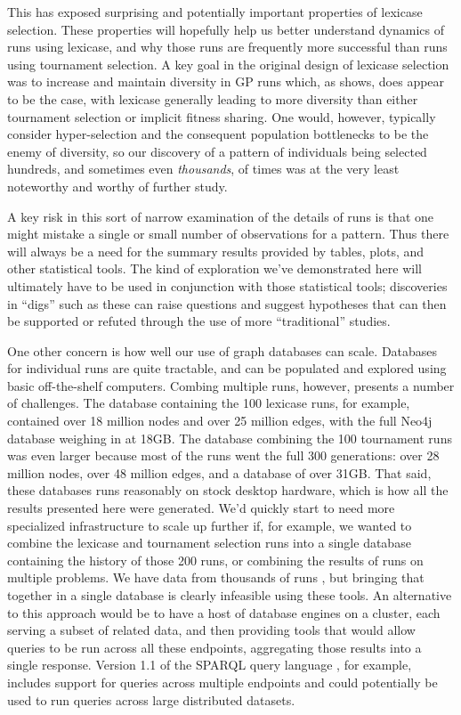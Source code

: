 This has exposed surprising and potentially important properties of lexicase selection. These properties will 
hopefully help us better understand dynamics of runs using lexicase, and why those runs are frequently more 
successful than runs using tournament selection. A key goal in the original design of lexicase selection 
\citep{Helmuth:2015:ieeeTEC} was to increase and maintain diversity in GP runs which, as \citep{Helmuth:2015:GPTP}
shows, does appear to be the case, with lexicase generally leading to more diversity
than either tournament selection or implicit fitness sharing. One would, however, typically consider hyper-selection
and the consequent population bottlenecks to be the enemy of diversity, so our discovery of a pattern of
individuals being selected hundreds, and sometimes even \emph{thousands}, of times was at the very least noteworthy
and worthy of further study.

A key risk in this sort of narrow examination of the details of runs is that one might mistake a single or small
number of observations for a pattern. Thus there will always be a need for the summary results provided by tables, 
plots, and other statistical tools. The kind of exploration we've demonstrated here will ultimately have
to be used in conjunction with those statistical tools; discoveries in ``digs'' such as these can raise questions 
and suggest hypotheses that can then be supported or refuted through the use of more ``traditional'' studies.

One other concern is how well our use of graph databases can scale. Databases for individual runs are quite tractable,
and can be populated and explored using basic off-the-shelf computers. Combing multiple runs, however, presents a
number of challenges. The database containing the 100 lexicase runs, for example, contained over 18 million nodes 
and over 25 million edges, with the full Neo4j database weighing in at 18GB. The database combining the 100 tournament
runs was even larger because most of the runs went the full 300 generations: over 28 million nodes, over 48 million edges,
and a database of over 31GB. That said, these databases runs reasonably on stock desktop 
hardware, which is how all the results presented here were generated. We'd quickly start to need more specialized
infrastructure to scale up further if, for example, we wanted to combine the 
lexicase and tournament selection runs into a single database containing the history of those 200 runs, or combining
the results of runs on multiple problems. We have data from thousands of runs \citep{Helmuth:2015:GPTP}, but bringing
that together in a single database is clearly infeasible using these tools. An alternative to this approach would be
to have a host of database engines on a cluster, each serving a subset of related data, and then providing tools
that would allow queries to be run across all these endpoints, aggregating those results into a single response. Version
1.1 of the SPARQL query language \citep{wiki:SPARQL}, for example, includes support for queries across multiple endpoints
and could potentially be used to run queries across large distributed datasets.

